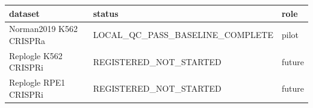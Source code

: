 \begin{tabular}{lll}
\toprule
dataset & status & role \\
\midrule
Norman2019 K562 CRISPRa & LOCAL_QC_PASS_BASELINE_COMPLETE & pilot \\
Replogle K562 CRISPRi & REGISTERED_NOT_STARTED & future \\
Replogle RPE1 CRISPRi & REGISTERED_NOT_STARTED & future \\
\bottomrule
\end{tabular}

